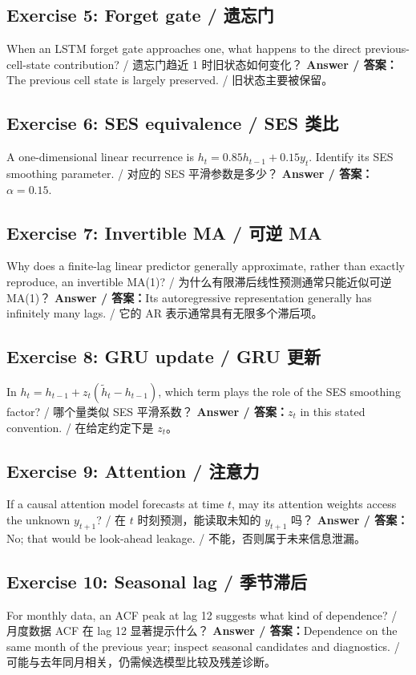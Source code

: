 \documentclass[UTF8,fontset=fandol,10.5pt,a4paper]{ctexart}
\begin{document}
\subsection*{Exercise 5: Forget gate / 遗忘门}
When an LSTM forget gate approaches one, what happens to the direct previous-cell-state contribution? / 遗忘门趋近 1 时旧状态如何变化？
\textbf{Answer / 答案：}The previous cell state is largely preserved. / 旧状态主要被保留。
\subsection*{Exercise 6: SES equivalence / SES 类比}
A one-dimensional linear recurrence is $h_t=0.85h_{t-1}+0.15y_t$. Identify its SES smoothing parameter. / 对应的 SES 平滑参数是多少？
\textbf{Answer / 答案：}$\alpha=0.15$.
\subsection*{Exercise 7: Invertible MA / 可逆 MA}
Why does a finite-lag linear predictor generally approximate, rather than exactly reproduce, an invertible MA(1)? / 为什么有限滞后线性预测通常只能近似可逆 MA(1)？
\textbf{Answer / 答案：}Its autoregressive representation generally has infinitely many lags. / 它的 AR 表示通常具有无限多个滞后项。
\subsection*{Exercise 8: GRU update / GRU 更新}
In $h_t=h_{t-1}+z_t(\widetilde h_t-h_{t-1})$, which term plays the role of the SES smoothing factor? / 哪个量类似 SES 平滑系数？
\textbf{Answer / 答案：}$z_t$ in this stated convention. / 在给定约定下是 $z_t$。
\subsection*{Exercise 9: Attention / 注意力}
If a causal attention model forecasts at time $t$, may its attention weights access the unknown $y_{t+1}$? / 在 $t$ 时刻预测，能读取未知的 $y_{t+1}$ 吗？
\textbf{Answer / 答案：}No; that would be look-ahead leakage. / 不能，否则属于未来信息泄漏。
\subsection*{Exercise 10: Seasonal lag / 季节滞后}
For monthly data, an ACF peak at lag 12 suggests what kind of dependence? / 月度数据 ACF 在 lag 12 显著提示什么？
\textbf{Answer / 答案：}Dependence on the same month of the previous year; inspect seasonal candidates and diagnostics. / 可能与去年同月相关，仍需候选模型比较及残差诊断。
\clearpage
\end{document}
